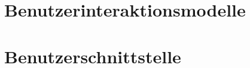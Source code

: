 \section{Benutzerinteraktionsmodelle}

	\begin{figure}[htbp]
	  \centering
	  
	\end{figure}


\section{Benutzerschnittstelle}

%	  
%
%	  
